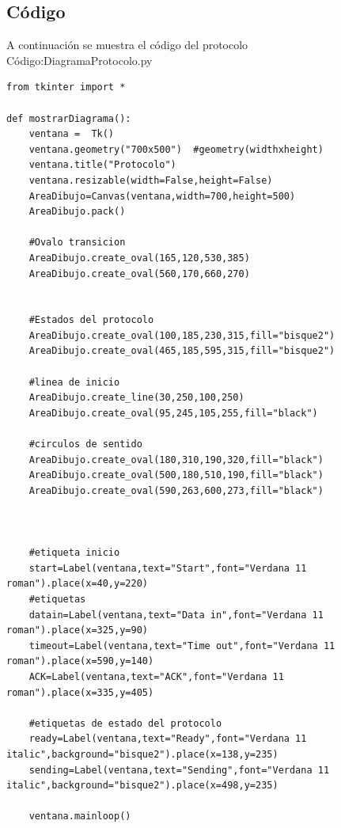 \documentclass[12pt,letterpaper]{article}
\begin{document}
\subsection{C\'odigo}
A continuaci\'on se muestra el c\'odigo del protocolo\\

C\'odigo:DiagramaProtocolo.py
\lstset{language=Python, breaklines=true, basicstyle=\footnotesize}
\begin{lstlisting}[frame=single]
	from tkinter import *

def mostrarDiagrama():
	ventana =  Tk()
	ventana.geometry("700x500")  #geometry(widthxheight)
	ventana.title("Protocolo")
	ventana.resizable(width=False,height=False)
	AreaDibujo=Canvas(ventana,width=700,height=500)
	AreaDibujo.pack()

	#Ovalo transicion
	AreaDibujo.create_oval(165,120,530,385)
	AreaDibujo.create_oval(560,170,660,270)


	#Estados del protocolo
	AreaDibujo.create_oval(100,185,230,315,fill="bisque2")
	AreaDibujo.create_oval(465,185,595,315,fill="bisque2")

	#linea de inicio
	AreaDibujo.create_line(30,250,100,250)
	AreaDibujo.create_oval(95,245,105,255,fill="black")

	#circulos de sentido
	AreaDibujo.create_oval(180,310,190,320,fill="black")
	AreaDibujo.create_oval(500,180,510,190,fill="black")
	AreaDibujo.create_oval(590,263,600,273,fill="black")



	#etiqueta inicio
	start=Label(ventana,text="Start",font="Verdana 11 roman").place(x=40,y=220)
	#etiquetas
	datain=Label(ventana,text="Data in",font="Verdana 11 roman").place(x=325,y=90)
	timeout=Label(ventana,text="Time out",font="Verdana 11 roman").place(x=590,y=140)
	ACK=Label(ventana,text="ACK",font="Verdana 11 roman").place(x=335,y=405)

	#etiquetas de estado del protocolo
	ready=Label(ventana,text="Ready",font="Verdana 11 italic",background="bisque2").place(x=138,y=235)
	sending=Label(ventana,text="Sending",font="Verdana 11 italic",background="bisque2").place(x=498,y=235)

	ventana.mainloop()
\end{lstlisting}
\vspace{1 cm}
\end{document}
